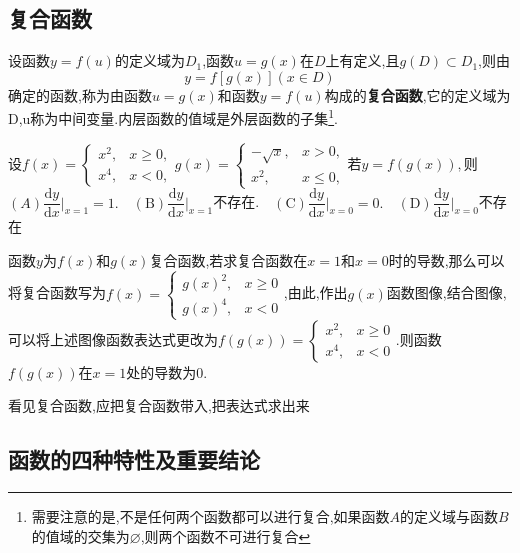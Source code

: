 \documentclass[8pt a4paper, oneside, UTF8]{ctexbook}  %
\begin{document}
\begin{sloppypar}
    \subsection{复合函数}
    设函数$y=f(u)$的定义域为$D_1$,函数$u=g(x)$在$D$上有定义,且$ g(D) \subset D_1$,则由
    $$
        y=f[g(x)](x{\in}D)
    $$
    确定的函数,称为由函数$u=g(x)$和函数$y=f(u)$构成的\textbf{复合函数},它的定义域为D,u称为中间变量.内层函数的值域是外层函数的子集\footnote{需要注意的是,不是任何两个函数都可以进行复合,如果函数$A$的定义域与函数$B$的值域的交集为$\varnothing$,则两个函数不可进行复合}.
    \begin{problem}
    $\text{设}f(x)=\begin{cases}x^2,&x\geqslant0,\\x^4,&x<0,\end{cases}g(x)=\begin{cases}-\sqrt{x},&x>0,\\x^2,&x\leqslant0,\end{cases}\text{若}y=f(g(x)),$则\\
    $(A)\dfrac{\mathrm{d}y}{\mathrm{d}x}\bigg|_{x=1}=1.\quad(\mathrm{B})\dfrac{\mathrm{d}y}{\mathrm{d}x}\bigg|_{x=1}$不存在.$\quad(\mathrm{C})\dfrac{\mathrm{d}y}{\mathrm{d}x}\bigg|_{x=0}=0.\quad(\mathrm{D})\dfrac{\mathrm{d}y}{\mathrm{d}x}\bigg|_{x=0}$不存在
    \end{problem}
    \begin{solution}
        函数$y$为$f(x)$和$g(x)$复合函数,若求复合函数在$x=1$和$x=0$时的导数,那么可以将复合函数写为$f(x)=\begin{cases}g(x)^2,&x \geqslant 0\\g(x)^4,&x<0\end{cases}$,由此,作出$g(x)$函数图像,结合图像,可以将上述图像函数表达式更改为$f(g(x))=\begin{cases}x^2,&x\geqslant0\\x^4,&x<0\end{cases}$.则函数$f(g(x))$在$x=1$处的导数为0.
    \end{solution}
    \begin{note}
        看见复合函数,应把复合函数带入,把表达式求出来
    \end{note}
    \subsection{函数的四种特性及重要结论}

\end{sloppypar}
\end{document}
